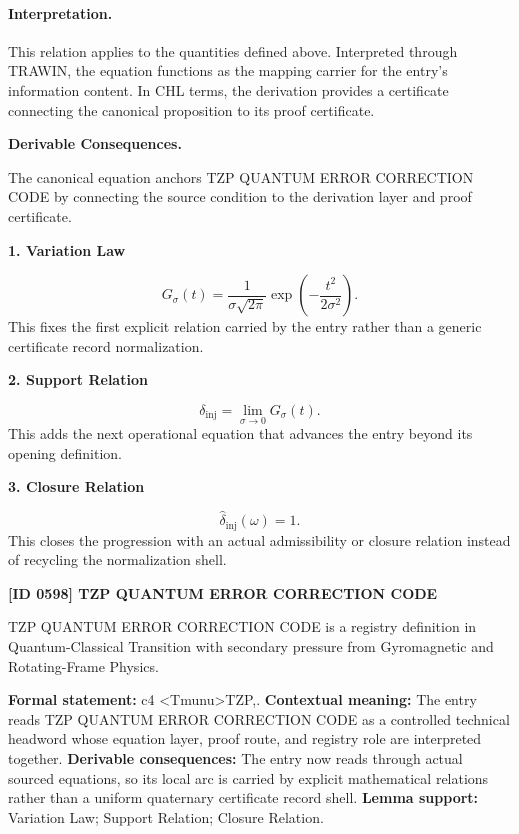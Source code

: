 \paragraph{Interpretation.}
This relation applies to the quantities defined above. Interpreted through TRAWIN, the equation functions as the mapping carrier for the entry’s information content. In CHL terms, the derivation provides a certificate connecting the canonical proposition to its proof certificate.

\par\vspace{0.35em}
\noindent\textbf{Derivable Consequences.}\quad
\begingroup
\footnotesize
\raggedright
The canonical equation anchors TZP QUANTUM ERROR CORRECTION CODE by connecting the source condition to the derivation layer and proof certificate.
\par\endgroup

\noindent\textbf{1. Variation Law}\par
\[
G_{\sigma}(t) = \frac{1}{\sigma\sqrt{2\pi}} \exp\left( -\frac{t^2}{2\sigma^2} \right).
\]
\noindent This fixes the first explicit relation carried by the entry rather than a generic certificate record normalization.\par
\noindent\textbf{2. Support Relation}\par
\[
\delta_{\mathrm{inj}} = \lim_{\sigma\to0}G_{\sigma}(t).
\]
\noindent This adds the next operational equation that advances the entry beyond its opening definition.\par
\noindent\textbf{3. Closure Relation}\par
\[
\widehat{\delta}_{\mathrm{inj}}(\omega)=1.
\]
\noindent This closes the progression with an actual admissibility or closure relation instead of recycling the normalization shell.\par

\clearpage
\noindent\textbf{[ID 0598] TZP QUANTUM ERROR CORRECTION CODE}\par
\vspace{0.35em}
\begingroup\small
{}
TZP QUANTUM ERROR CORRECTION CODE is a registry definition in Quantum-Classical Transition with secondary pressure from Gyromagnetic and Rotating-Frame Physics.

\begingroup\footnotesize\setlength{\emergencystretch}{3em}\sloppy
\textbf{Formal statement:} c4 <Tmunu>TZP,. \textbf{Contextual meaning:} The entry reads TZP QUANTUM ERROR CORRECTION CODE as a controlled technical headword whose equation layer, proof route, and registry role are interpreted together. \textbf{Derivable consequences:} The entry now reads through actual sourced equations, so its local arc is carried by explicit mathematical relations rather than a uniform quaternary certificate record shell. \textbf{Lemma support:} Variation Law; Support Relation; Closure Relation.\par
\endgroup

